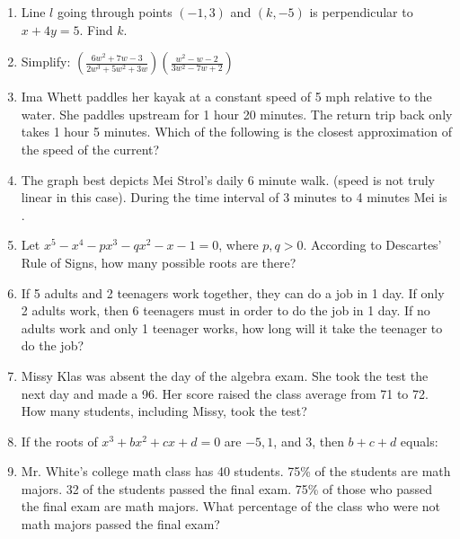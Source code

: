 \documentclass[../uilmath.tex]{subfiles}
\begin{document}
\begin{enumerate}[label=\bfseries\arabic*.]
        \item %
        Line $l$ going through points $(-1,3)$ and $(k,-5)$ is perpendicular to $x+4y=5$. Find $k$.

        \item %
        Simplify: $\left(\frac{6w^2+7w-3}{2w^3+5w^2+3w}\right)\left(\frac{w^2-w-2}{3w^2-7w+2}\right)$

        \item %
        Ima Whett paddles her kayak at a constant speed of 5 mph relative to the water. She paddles upstream for 
        1 hour 20 minutes. The return trip back only takes 1 hour 5 minutes. Which of the following is the closest approximation of the speed of the current?

        \item %
        The graph best depicts Mei Strol's daily 6 minute walk. (speed is not truly linear in this case). During the time interval of 3 minutes to 4 minutes Mei is \blank .

        \item %
        Let $x^5-x^4-px^3-qx^2-x-1=0$, where $p,q>0$. According to Descartes' Rule of Signs, how many possible roots are there?

        \item %
        If 5 adults and 2 teenagers work together, they can do a job in 1 day. If only 2 adults work, then 6 teenagers must 
        in order to do the job in 1 day. If no adults work and only 1 teenager works, how long will it take the teenager to do the job?

        \item %
        Missy Klas was absent the day of the algebra exam. She took the test the next day and made a 96. Her score raised the class average from 71 to 72.
        How many students, including Missy, took the test?

        \item %
        If the roots of $x^3+bx^2+cx+d=0$ are $-5,1$, and $3$, then $b+c+d$ equals:

        \item %
        Mr. White's college math class has 40 students. 75\% of the students are math majors. 32 of the students passed the final exam.
        75\% of those who passed the final exam are math majors. What percentage of the class who were not math majors passed the final exam?


\end{enumerate}
\end{document}
